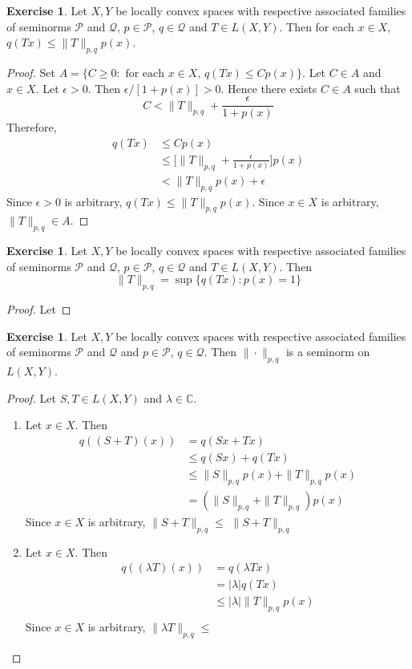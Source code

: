 \documentclass[12pt]{amsart}
\theoremstyle{definition}
\newtheorem{ex}[definition]{Exercise}
\newcommand{\lam}{\lambda}
\newcommand{\ep}{\epsilon}
\newcommand{\C}{\mathbb{C}}
\newcommand{\MP}{\mathcal{P}}
\newcommand{\MQ}{\mathcal{Q}}
\DeclareMathOperator*{\0}{\mbf{0}}
\DeclareMathOperator*{\1}{\mbf{1}}
\begin{document}
\begin{ex}
	Let $X, Y$ be locally convex spaces with respective associated families of seminorms $\MP$ and $\MQ$, $p \in \MP$, $q \in \MQ$ and $T \in L(X,Y)$. Then for each $x \in X$, $q(Tx) \leq \|T\|_{p,q}p(x)$. 
\end{ex}

\begin{proof}
	Set $A = \{C \geq 0: \text{ for each $x \in X$, $q(Tx) \leq Cp(x)$} \}$. Let $C \in A$ and $x \in X$. Let $\ep >0$. Then $\ep / [1 + p(x)] > 0$. Hence there exists $C \in A$ such that $$C < \|T\|_{p,q} + \frac{\ep}{1 + p(x)}$$
	Therefore, 
	\begin{align*}
		q(Tx) 
		& \leq Cp(x) \\
		& \leq \bigg[\|T\|_{p,q} + \frac{\ep}{1 + p(x)}\bigg]p(x) \\
		& < \|T\|_{p,q}p(x) + \ep
	\end{align*}
	Since $\ep >0$ is arbitrary, $q(Tx) \leq \|T\|_{p,q}p(x) $. Since $x \in X$ is arbitrary, $\|T\|_{p,q} \in A$. 
\end{proof}

	\begin{ex}
		Let $X, Y$ be locally convex spaces with respective associated families of seminorms $\MP$ and $\MQ$, $p \in \MP$, $q \in \MQ$ and $T \in L(X,Y)$. Then 
		$$\|T\|_{p,q} = \sup \{q(Tx): p(x) = 1\}$$
	\end{ex}

	\begin{proof}
		Let 
	\end{proof}

\begin{ex}
	Let $X, Y$ be locally convex spaces with respective associated families of seminorms $\MP$ and $\MQ$ and $p \in \MP$, $q \in \MQ$. Then $\|\cdot\|_{p,q}$ is a seminorm  on $L(X,Y)$. 
\end{ex}

\begin{proof}
	Let $S, T \in L(X,Y)$ and $\lam \in \C$. 
	\begin{enumerate}
		\item Let $x \in X$. Then 
		\begin{align*}
			q((S+T)(x)) 
			& = q(Sx + Tx) \\
			& \leq q(Sx) + q(Tx) \\
			& \leq \|S\|_{p,q}p(x) + \|T\|_{p,q}p(x) \\
			& =  (\|S\|_{p,q} + \|T\|_{p,q}) p(x)
		\end{align*}
		Since $x \in X$ is arbitrary, $\|S+T\|_{p,q} \leq $
		$\|S + T\|_{p,q} $
		\item Let $x \in X$. Then 
		\begin{align*}
			q((\lam T)(x)) 
			& = q(\lam Tx) \\
			& = |\lam| q(Tx) \\
			& \leq |\lam |\|T\|_{p,q}p(x) \\
		\end{align*}
		Since $x \in X$ is arbitrary, $\|\lam T\|_{p,q} \leq $
	\end{enumerate}
\end{proof}
\end{document}
